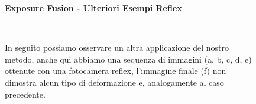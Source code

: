 \documentclass[10pt,journal,cspaper,compsoc]{IEEEtran}
\newcommand*{\figuretitle}[1]{%
    {\centering%
    \textbf{#1}%
    \par\medskip}%
}
\begin{document}
\begin{figure}[ht]
    \centering
    \figuretitle{Exposure Fusion - Ulteriori Esempi Reflex} 
     \hfill
     \hfill
    \\[0pt]
     \hfill
     \hfill
     \hfill

    \caption[Commento Reflex.]{
        In seguito possiamo osservare un altra applicazione del nostro metodo, anche qui abbiamo una sequenza di immagini 
        (a, b, c, d, e) ottenute con una fotocamera reflex, l'immagine finale (f) non dimostra alcun tipo di deformazione
        e, analogamente al caso precedente.
        }\label{fig:fusion}

\end{figure}
\end{document}

